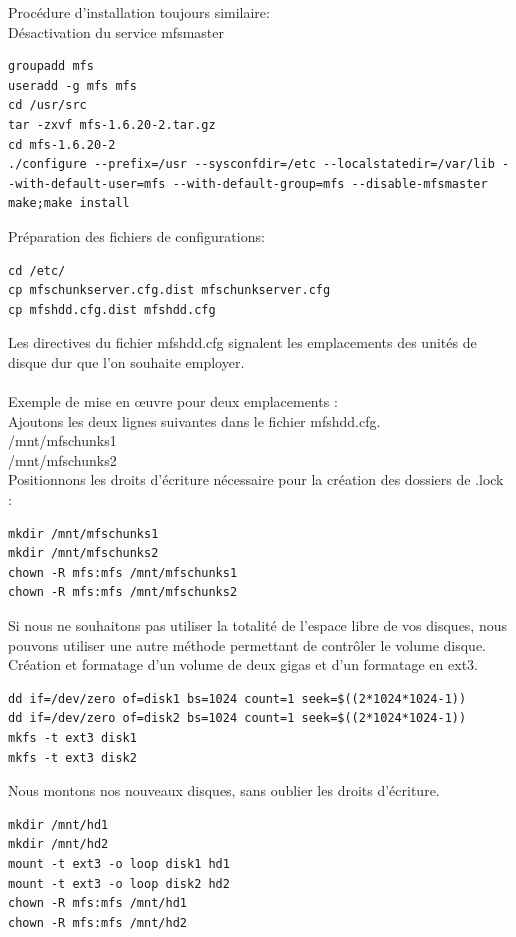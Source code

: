 \documentclass[12pt]{report}
\begin{document}
Procédure d'installation toujours similaire:\\
Désactivation du service mfsmaster\\
  \begin{lstlisting}
groupadd mfs
useradd -g mfs mfs
cd /usr/src
tar -zxvf mfs-1.6.20-2.tar.gz
cd mfs-1.6.20-2
./configure --prefix=/usr --sysconfdir=/etc --localstatedir=/var/lib --with-default-user=mfs --with-default-group=mfs --disable-mfsmaster
make;make install
	  \end{lstlisting}
Préparation des fichiers de configurations:\\
  \begin{lstlisting}
cd /etc/
cp mfschunkserver.cfg.dist mfschunkserver.cfg
cp mfshdd.cfg.dist mfshdd.cfg
	  \end{lstlisting}
Les directives du fichier mfshdd.cfg signalent les emplacements des unités de disque dur que l'on souhaite employer.\\\\
Exemple de mise en œuvre pour deux emplacements :\\
Ajoutons les deux lignes suivantes dans le fichier mfshdd.cfg.\\
/mnt/mfschunks1\\
/mnt/mfschunks2\\
Positionnons les droits d'écriture nécessaire pour la création des dossiers de .lock :\\
  \begin{lstlisting}
mkdir /mnt/mfschunks1
mkdir /mnt/mfschunks2
chown -R mfs:mfs /mnt/mfschunks1
chown -R mfs:mfs /mnt/mfschunks2
	  \end{lstlisting}
Si nous ne souhaitons pas utiliser la totalité de l'espace libre de vos disques, nous pouvons utiliser une autre méthode permettant de contrôler le volume disque.\\
Création et formatage d'un volume de deux gigas et d'un formatage en ext3.\\
  \begin{lstlisting}
dd if=/dev/zero of=disk1 bs=1024 count=1 seek=$((2*1024*1024-1))
dd if=/dev/zero of=disk2 bs=1024 count=1 seek=$((2*1024*1024-1))
mkfs -t ext3 disk1
mkfs -t ext3 disk2
	  \end{lstlisting}
Nous montons nos nouveaux disques, sans oublier les droits d'écriture.\\
  \begin{lstlisting}
mkdir /mnt/hd1
mkdir /mnt/hd2
mount -t ext3 -o loop disk1 hd1
mount -t ext3 -o loop disk2 hd2
chown -R mfs:mfs /mnt/hd1
chown -R mfs:mfs /mnt/hd2
	  \end{lstlisting}
\end{document}
